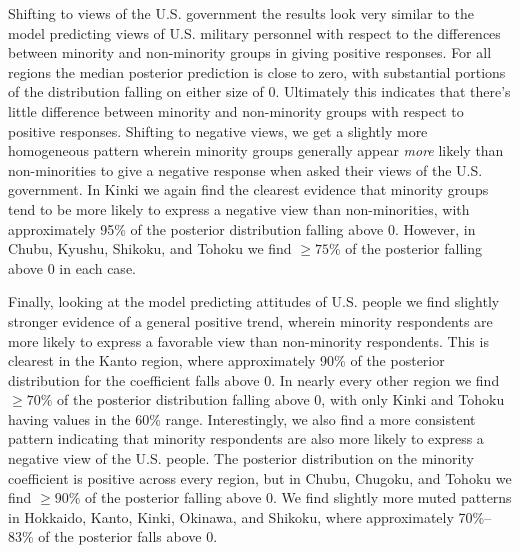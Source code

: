 Shifting to views of the U.S. government the results look very similar to the model predicting views of U.S. military personnel with respect to the differences between minority and non-minority groups in giving positive responses. For all regions the median posterior prediction is close to zero, with substantial portions of the distribution falling on either size of 0. Ultimately this indicates that there's little difference between minority and non-minority groups with respect to positive responses. Shifting to negative views, we get a slightly more homogeneous pattern wherein minority groups generally appear \textit{more} likely than non-minorities to give a negative response when asked their views of the U.S. government. In Kinki we again find the clearest evidence that minority groups tend to be more likely to express a negative view than non-minorities, with approximately 95\% of the posterior distribution falling above 0. However, in Chubu, Kyushu, Shikoku, and Tohoku we find $\geq 75\%$ of the posterior falling above 0 in each case.

Finally, looking at the model predicting attitudes of U.S. people we find slightly stronger evidence of a general positive trend, wherein minority respondents are more likely to express a favorable view than non-minority respondents. This is clearest in the Kanto region, where approximately 90\% of the posterior distribution for the coefficient falls above 0. In nearly every other region we find $\geq 70\%$ of the posterior distribution falling above 0, with only Kinki and Tohoku having values in the 60\% range. Interestingly, we also find a more consistent pattern indicating that minority respondents are also more likely to express a negative view of the U.S. people. The posterior distribution on the minority coefficient is positive across every region, but in Chubu, Chugoku, and Tohoku we find $\geq 90\%$ of the posterior falling above 0. We find slightly more muted patterns in Hokkaido, Kanto, Kinki, Okinawa, and Shikoku, where approximately 70\%--83\% of the posterior falls above 0.

